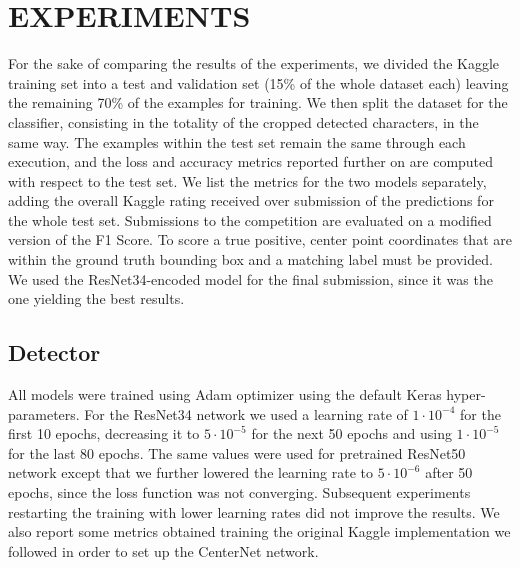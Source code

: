 \section{EXPERIMENTS}
\label{sec:experiments}

For the sake of comparing the results of the experiments, we divided the Kaggle training set into a test and validation set (15\% of the whole dataset each) leaving the remaining 70\% of the examples for training. We then split the dataset for the classifier, consisting in the totality of the cropped detected characters, in the same way. The examples within the test set remain the same through each execution, and the loss and accuracy metrics reported further on are computed with respect to the test set. We list the metrics for the two models separately, adding the overall Kaggle rating received over submission of the predictions for the whole test set. Submissions to the competition are evaluated on a modified version of the F1 Score. To score a true positive, center point coordinates that are within the ground truth bounding box and a matching label must be provided. We used the ResNet34-encoded model for the final submission, since it was the one yielding the best results.

\subsection{Detector}
\label{ssec:detectorexp}

All models were trained using Adam optimizer using the default Keras hyper-parameters. For the ResNet34 network we used a learning rate of $1 \cdot 10^{-4}$ for the first 10 epochs, decreasing it to $5 \cdot 10^{-5}$ for the next 50 epochs and using $1 \cdot 10^{-5}$ for the last 80 epochs. The same values were used for pretrained ResNet50 network except that we further lowered the learning rate to $5 \cdot 10^{-6}$ after 50 epochs, since the loss function was not converging. Subsequent experiments restarting the training with lower learning rates did not improve the results. We also report some metrics obtained training the original Kaggle implementation we followed in order to set up the CenterNet network.

